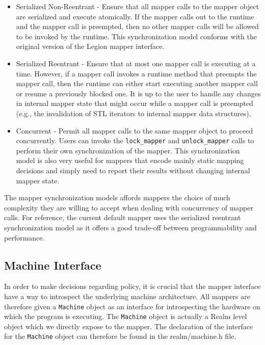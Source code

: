 \begin{itemize}
\item Serialized Non-Reentrant - Ensure that all mapper calls to the
      mapper object are serialized and execute atomically. If the mapper 
      calls out to the runtime and the mapper call is preempted, then 
      no other mapper calls will be allowed to be invoked by the runtime.
      This synchronization model conforms with the original version of
      the Legion mapper interface.
\item Serialized Reentrant - Ensure that at most one mapper call is 
      executing at a time. However, if a mapper call invokes a runtime
      method that preempts the mapper call, then the runtime can either
      start executing another mapper call or resume a previously blocked
      one. It is up to the user to handle any changes in internal mapper
      state that might occur while a mapper call is preempted (e.g., the
      invalidation of STL iterators to internal mapper data structures).
\item Concurrent - Permit all mapper calls to the same mapper object to
      proceed concurrently. Users can invoke the {\tt lock\_mapper} and
      {\tt unlock\_mapper} calls to perform their own synchronization
      of the mapper. This synchronization model is also very useful for
      mappers that encode mainly static mapping decisions and simply
      need to report their results without changing internal mapper state.
\end{itemize}

The mapper synchronization models affords mappers the choice of much
complexity they are willing to accept when dealing with concurrency of
mapper calls. For reference, the current default mapper uses the 
serialized reentrant synchronization model as it offers a good trade-off
between programmability and performance.

\subsection{Machine Interface}
\label{subsec:mapping:machine}

In order to make decisions regarding policy, it is crucial that the mapper
interface have a way to introspect the underlying machine architecture.
All mappers are therefore given a {\tt Machine} object as an interface
for introspecting the hardware on which the program is executing. The
{\tt Machine} object is actually a Realm level object which we directly
expose to the mapper. The declaration of the interface for the {\tt Machine}
object can therefore be found in the realm/machine.h file.

